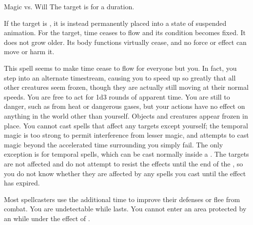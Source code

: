 \begin{spellheader}
    \begin{spelltargetinginfo}
    \end{spelltargetinginfo}
\end{spellheader}
\begin{spellcontent}
    \begin{spelleffects}
        \begin{spellattack}{Magic vs. Will}
            \spellsuccess The target is \slowed for a \durlong duration.

            If the target is \bloodied, it is instead permanently placed into a state of suspended animation. For the target, time ceases to flow and its condition becomes fixed. It does not grow older. Its body functions virtually cease, and no force or effect can move or harm it.
        \end{spellattack}
    \end{spelleffects}
\end{spellcontent}
\begin{spellfooter}

\end{spellfooter}

\begin{spellheader}
\end{spellheader}
\begin{spellcontent}
    \spelleffect This spell seems to make time cease to flow for everyone but you. In fact, you step into an alternate timestream, causing you to speed up so greatly that all other creatures seem frozen, though they are actually still moving at their normal speeds. You are free to act for 1d3 rounds of apparent time. You are still \vulnerable to danger, such as from heat or dangerous gases, but your actions have no effect on anything in the world other than yourself. Objects and creatures appear frozen in place. You cannot cast spells that affect any targets except yourself; the temporal magic is too strong to permit interference from lesser magic, and attempts to cast magic beyond the accelerated time surrounding you simply fail. The only exception is for temporal spells, which can be cast normally inside a . The targets are not affected and do not attempt to resist the effects until the end of the , so you do not know whether they are affected by any spells you cast until the effect has expired.
\end{spellcontent}
\begin{spellfooter}
    \spellnotes Most spellcasters use the additional time to improve their defenses or flee from combat. You are undetectable while  lasts. You cannot enter an area protected by an  while under the effect of .
\end{spellfooter}

